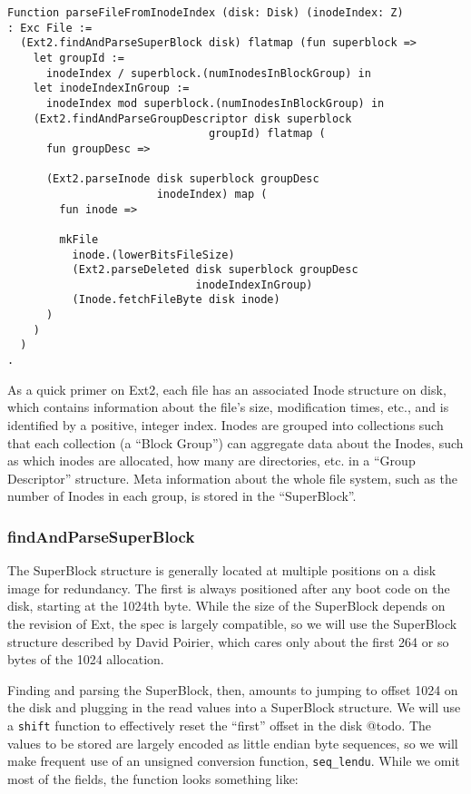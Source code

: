 \documentclass[nocopyrightspace]{sigplanconf}
\begin{document}
\begin{lstlisting}
Function parseFileFromInodeIndex (disk: Disk) (inodeIndex: Z) 
: Exc File :=
  (Ext2.findAndParseSuperBlock disk) flatmap (fun superblock =>
    let groupId := 
      inodeIndex / superblock.(numInodesInBlockGroup) in
    let inodeIndexInGroup := 
      inodeIndex mod superblock.(numInodesInBlockGroup) in
    (Ext2.findAndParseGroupDescriptor disk superblock 
                               groupId) flatmap (
      fun groupDesc =>

      (Ext2.parseInode disk superblock groupDesc 
                       inodeIndex) map (
        fun inode =>

        mkFile
          inode.(lowerBitsFileSize)
          (Ext2.parseDeleted disk superblock groupDesc
                             inodeIndexInGroup)
          (Inode.fetchFileByte disk inode)
      )
    )
  )
.
\end{lstlisting}

As a quick primer on Ext2, each file has an associated Inode structure on
disk, which contains information about the file's size, modification times,
etc., and is identified by a positive, integer index. Inodes are grouped into
collections such that each collection (a ``Block Group'') can aggregate data
about the Inodes, such as which inodes are allocated, how many are
directories, etc. in a ``Group Descriptor'' structure. Meta information about
the whole file system, such as the number of Inodes in each group, is stored
in the ``SuperBlock''.

\subsubsection{findAndParseSuperBlock}

The SuperBlock structure is generally located at multiple positions on a disk
image for redundancy. The first is always positioned after any boot code on
the disk, starting at the 1024th byte. While the size of the SuperBlock
depends on the revision of Ext, the spec is largely compatible, so we will use
the SuperBlock structure described by David Poirier\cite{non-gnu}, which cares
only about the first 264 or so bytes of the 1024 allocation.

Finding and parsing the SuperBlock, then, amounts to jumping to offset 1024 on
the disk and plugging in the read values into a SuperBlock structure. We will
use a {\tt shift} function to effectively reset the ``first'' offset in the
disk @todo. The values to be stored are largely encoded as little endian byte
sequences, so we will make frequent use of an unsigned conversion function,
{\tt seq\_lendu}. While we omit most of the fields, the function looks
something like:
\end{document}
